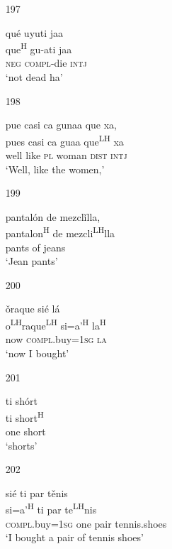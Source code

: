 \begin{itemize}
\item[197]
 
\glll   qu\'{e} uyuti jaa\\
 que\textsuperscript{H} gu-ati jaa\\
\textsc{neg} \textsc{compl}-die \textsc{intj}\\
\glt `not dead ha'
 


\item[198]
 
\glll   pue casi ca gunaa que xa, \\
 pues casi ca guaa que\textsuperscript{LH} xa\\
well like \textsc{pl}  woman \textsc{dist} \textsc{intj} \\
\glt `Well, like the women,'
 


\item[199]
 
\glll   pantal\'{o}n de mezcl\v{i}lla,\\
pantalon\textsuperscript{H} de mezcli\textsuperscript{LH}lla\\
 pants of jeans\\
\glt `Jean pants'
 


\item[200]
 
\glll   \v{o}raque si\'{e} l\'{a}\\
o\textsuperscript{LH}raque\textsuperscript{LH} si=a'\textsuperscript{H} la\textsuperscript{H}\\
 now \textsc{compl}.buy=\textsc{1sg} \textsc{la}\\
\glt `now I bought'
 


\item[201]
 
\glll   ti sh\'{o}rt\\
ti short\textsuperscript{H}\\
one short \\
\glt `shorts'
 


\item[202]
 
\glll   si\'{e} ti par t\v{e}nis\\
si=a'\textsuperscript{H} ti par te\textsuperscript{LH}nis\\ 
 \textsc{compl}.buy=\textsc{1sg} one pair tennis.shoes\\
\glt `I bought a pair of tennis shoes'
 



\end{itemize}
